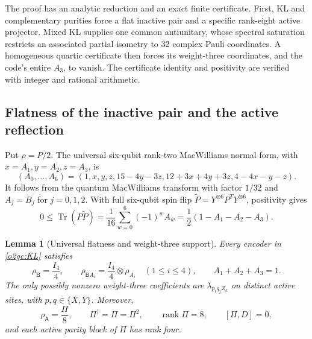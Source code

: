 \documentclass[11pt]{article}
\newcommand{\rank}{\operatorname{rank}}
\newtheorem{lemma}[theorem]{Lemma}
\theoremstyle{definition}
\begin{document}
The proof has an analytic reduction and an exact finite certificate.
First, KL and complementary purities force a flat inactive pair and a
specific rank-eight active projector. Mixed KL supplies one common
antiunitary, whose spectral saturation restricts an associated partial
isometry to 32 complex Pauli coordinates. A homogeneous quartic
certificate then forces its weight-three coordinates, and the code's
entire \(A_3\), to vanish. The certificate identity and positivity are
verified with integer and rational arithmetic.

\subsection{Flatness of the inactive pair and the active reflection}
\label{o2gc:subsec-flatness}

Put \(\rho=P/2\). The universal six-qubit rank-two MacWilliams normal
form, with \(x=A_1,y=A_2,z=A_3\), is
\begin{equation}
 (A_0,\ldots,A_6)=
 (1,x,y,z,15-4y-3z,12+3x+4y+3z,4-4x-y-z).
 \label{o2gc:MacWilliams}
\end{equation}
It follows from the quantum MacWilliams transform with factor \(1/32\)
and \(A_j=B_j\) for \(j=0,1,2\). With full six-qubit spin flip
\(\widetilde P=Y^{\otimes6}P^TY^{\otimes6}\), positivity gives
\begin{equation}
 0\le\operatorname{Tr}(P\widetilde P)
 =\frac1{16}\sum_{w=0}^6(-1)^wA_w
 =\frac12(1-A_1-A_2-A_3).
 \label{o2gc:shadow}
\end{equation}

\begin{lemma}[Universal flatness and weight-three support]
\label{o2gc:lem-flatness}
Every encoder in \eqref{o2gc:KL} satisfies
\begin{equation}
 \rho_{\mathsf B}=\frac{I_4}{4},\qquad
 \rho_{\mathsf B A_i}=\frac{I_4}{4}\otimes\rho_{A_i}
 \quad(1\le i\le4),\qquad A_1+A_2+A_3=1.
 \label{o2gc:flatness}
\end{equation}
The only possibly nonzero weight-three coefficients are
\(\lambda_{p_iq_jZ_k}\) on distinct active sites, with
\(p,q\in\{X,Y\}\). Moreover,
\begin{equation}
 \rho_{\mathsf A}=\frac{\Pi}{8},\qquad
 \Pi^\dagger=\Pi=\Pi^2,\qquad \rank\Pi=8,\qquad [\Pi,D]=0,
 \label{o2gc:active-projector}
\end{equation}
and each active parity block of \(\Pi\) has rank four.
\end{lemma}
\end{document}
